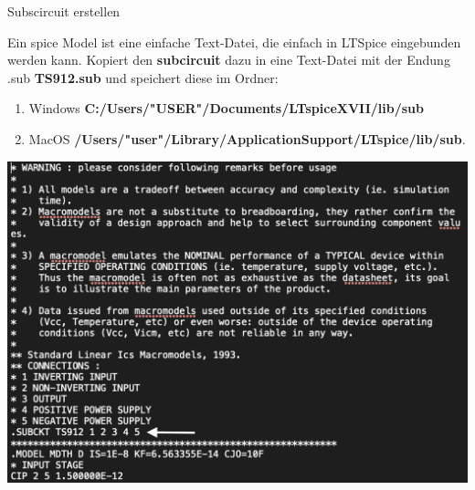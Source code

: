 \begin{frame}[t]{Subscircuit erstellen} 

    Ein spice Model ist eine einfache Text-Datei, die einfach in LTSpice eingebunden werden kann.
    Kopiert den \textbf{subcircuit} dazu in eine Text-Datei mit der Endung .sub \textbf{TS912.sub} und speichert diese im Ordner:

    \begin{scriptsize}
        \begin{enumerate}
            \item Windows \textbf{C:/Users/"USER"/Documents/LTspiceXVII/lib/sub}
            \item MacOS \textbf{/Users/"user"/Library/ApplicationSupport/LTspice/lib/sub}.
        \end{enumerate}
    \end{scriptsize}

    \begin{spacing}{0.9} \begin{tiny}
        \begin{minipage}{\textwidth}
          \includegraphics[width=0.5\linewidth]{pictures/spice_model.png}
        \end{minipage}
    \end{tiny} \end{spacing}
\end{frame}


